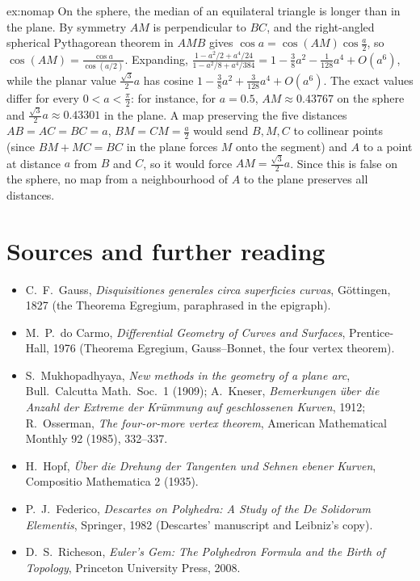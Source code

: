 \begin{solution}{ex:nomap}
\idea On the sphere, the median of an equilateral triangle is longer than in the plane.
\writeup By symmetry $AM$ is perpendicular to $BC$, and the right-angled spherical Pythagorean theorem in $AMB$ gives $\cos a=\cos(AM)\cos\frac a2$, so
$\cos(AM)=\frac{\cos a}{\cos(a/2)}$. Expanding, $\frac{1-a^2/2+a^4/24}{1-a^2/8+a^4/384}=1-\frac38a^2-\frac1{128}a^4+O(a^6)$, while the planar value $\frac{\sqrt3}2a$ has cosine
$1-\frac38a^2+\frac{3}{128}a^4+O(a^6)$. The exact values differ for every $0<a<\frac\pi2$: for instance, for $a=0.5$, $AM\approx0.43767$ on the sphere and
$\frac{\sqrt3}2a\approx0.43301$ in the plane. A map preserving the five distances $AB=AC=BC=a$, $BM=CM=\frac a2$ would send $B,M,C$ to collinear points (since
$BM+MC=BC$ in the plane forces $M$ onto the segment) and $A$ to a point at distance $a$ from $B$ and $C$, so it would force $AM=\frac{\sqrt3}2a$. Since this is false on the
sphere, no map from a neighbourhood of $A$ to the plane preserves all distances.
\end{solution}

\section*{Sources and further reading}

\begin{itemize}
\item C.~F.~Gauss, \emph{Disquisitiones generales circa superficies curvas}, G\"ottingen, 1827 (the Theorema Egregium, paraphrased in the epigraph).
\item M.~P.~do Carmo, \emph{Differential Geometry of Curves and Surfaces}, Prentice-Hall, 1976 (Theorema Egregium, Gauss--Bonnet, the four vertex theorem).
\item S.~Mukhopadhyaya, \emph{New methods in the geometry of a plane arc}, Bull.\ Calcutta Math.\ Soc.\ 1 (1909); A.~Kneser, \emph{Bemerkungen \"uber die Anzahl der
Extreme der Kr\"ummung auf geschlossenen Kurven}, 1912; R.~Osserman, \emph{The four-or-more vertex theorem}, American Mathematical Monthly 92 (1985), 332--337.
\item H.~Hopf, \emph{\"Uber die Drehung der Tangenten und Sehnen ebener Kurven}, Compositio Mathematica 2 (1935).
\item P.~J.~Federico, \emph{Descartes on Polyhedra: A Study of the De Solidorum Elementis}, Springer, 1982 (Descartes' manuscript and Leibniz's copy).
\item D.~S.~Richeson, \emph{Euler's Gem: The Polyhedron Formula and the Birth of Topology}, Princeton University Press, 2008.
\end{itemize}
